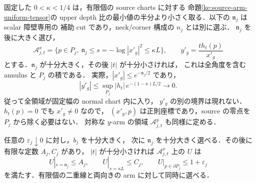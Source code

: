 固定した $0<\kappa<1/4$ は，有限個の source charts に対する
命題\ref{ke:source-arm-uniform-tensor}の upper depth 比の最小値の半分より小さく取る．以下の $\mathfrak n_j$ は scalar 障壁専用の
補助 cut であり，neck/corner 構成の $n_j$ とは別に選ぶ．
$\mathfrak n_j$ を後に大きく選び，
\begin{equation}\label{ke:eq:sharp-normal-domain}
 \mathcal A^x_{j,t}
 =\{p\in P_j,\ \mathfrak n_j\le s=-\log|x'_g|^2\le\kappa L\},
 \qquad y'_g=\frac{t h_t(p)}{x'_g}
\end{equation}
とする．$\mathfrak n_j$ が十分大きく，その後 $|t|$ が十分小さければ，
これは全角度を含む annulus と $P_j$ の積である．
実際，$|x'_g|\le e^{-\mathfrak n_j/2}$ であり，
\[
 |y'_g|\le\sup_{P_j}|h_t|\,e^{-(1-\kappa)L/2}\longrightarrow0.
\]
従って全領域が固定幅の normal chart 内に入り，
$y'_g$ の別の境界は現れない．$h_t(p)=0$ でも $x'_g\ne0$ なので，
$(x'_g,p)$ は正則座標であり，source の零点を $P_j$ から除く必要はない．
対称な $y$-arm の領域 $\mathcal A^y_{j,t}$ も同様に定める．

\begin{lemma}[比較領域の三種類の境界評価]
\label{ke:sharp-normal-boundary-inputs}
任意の $\varepsilon_j\downarrow0$ に対し，$b_j$ を十分大きく，
次に $\mathfrak n_j$ を十分大きく選べる．その後に有限な定数 $A_j,C_j$ があり，
$|t|$ が十分小さければ $\mathcal A^x_{j,t}$ 上の $U$ は
\begin{equation}\label{ke:eq:sharp-normal-boundaries}
 U|_{s=\mathfrak n_j}\le A_j,\qquad
 U|_{s=\kappa L}\le C_j,\qquad
 U|_{p\in\partial P_j}\le1+\varepsilon_j
\end{equation}
を満たす．有限個の二重線と両向きの arm に対して同時に選べる．
\end{lemma}

